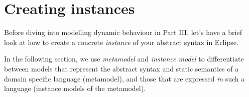 \newpage
\genHeader

\section{Creating instances}
\hypertarget{sec:creatingInstance common}{}

Before diving into modelling dynamic behaviour in Part III, let's have a brief look at how to create a concrete \emph{instance} of your abstract syntax in
Eclipse.

\vspace{0.5cm}

In the following section, we use \emph{metamodel} and \emph{instance model} to differentiate between models that represent the abstract syntax and static
semantics of a domain specific language (metamodel), and those that are expressed \emph{in} such a language (instance models of the metamodel).

